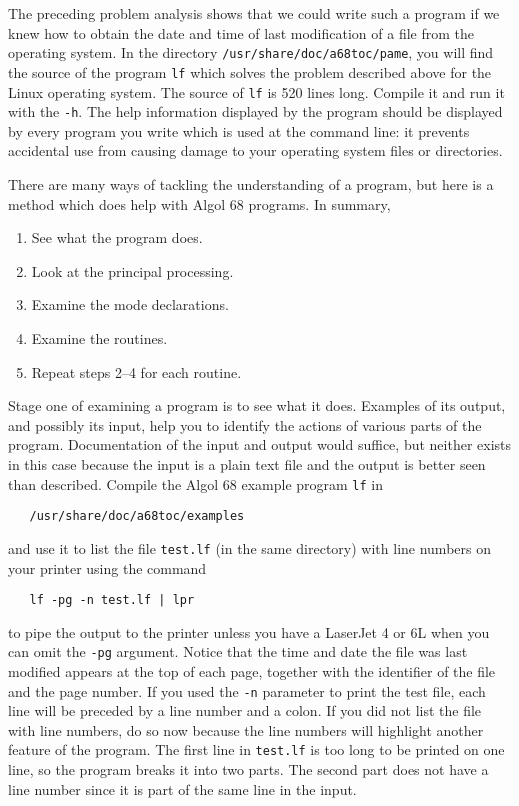The preceding problem analysis shows that we could write such a
program if we knew how to obtain the date and time of last
modification of a file from the operating system. In the directory
\verb|/usr/share/doc/a68toc/pame|, you will find the source of the
program \verb|lf| which solves the problem described above for the
Linux operating system. The source of \verb|lf| is 520 lines long.
Compile it and run it with the  \verb|-h|. The help
information displayed by the program should be displayed by every
program you write which is used at the command line: it prevents
accidental use from causing damage to your operating system files or
directories.

There are many ways of tackling the understanding of a program, but
here is a method which does help with Algol 68 programs. In summary,
\begin{enumerate}
\item See what the program does.
\item Look at the principal processing.
\item Examine the mode declarations.
\item Examine the routines.
\item Repeat steps 2--4 for each routine.
\end{enumerate}

Stage one of examining a program is to see what it does. Examples of
its output, and possibly its input, help you to identify the actions
of various parts of the program. Documentation of the input and
output would suffice, but neither exists in this case because the
input is a plain text file and the output is better seen than
described. Compile the Algol 68 example program \verb|lf| in
\begin{verbatim}
   /usr/share/doc/a68toc/examples
\end{verbatim}
\noindent
and use it to list the file \verb|test.lf| (in the same directory)
with line numbers on your printer using the command
\begin{verbatim}
   lf -pg -n test.lf | lpr
\end{verbatim}
\noindent
to pipe the output to the printer unless you have a LaserJet 4 or 6L
when you can omit the \verb|-pg| argument.  Notice that the time and
date the file was last modified appears at the top of each page,
together with the identifier of the file and the page number. If you
used the \verb|-n| parameter to print the test file, each line will
be preceded by a line number and a colon.  If you did not list the
file with line numbers, do so now because the line numbers will
highlight another feature of the program. The first line in
\verb|test.lf| is too long to be printed on one line, so the program
breaks it into two parts.  The second part does not have a line
number since it is part of the same line in the input.

